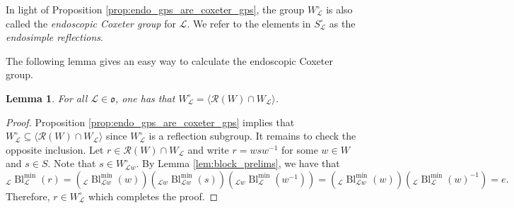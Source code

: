 \documentclass{amsart}
\newcommand{\scrL}{\mathcal{L}}
\newcommand{\fr}[1]{\mathfrak{#1}}
\DeclareMathOperator{\Bl}{Bl}
\newtheorem{lemma}[subsubsection]{Lemma}
\theoremstyle{definition}
\numberwithin{equation}{subsection}
\begin{document}
In light of Proposition \ref{prop:endo_gps_are_coxeter_gps}, the group $W_{\scrL}^{\circ}$ is also called the \emph{endoscopic Coxeter group} for $\scrL$.
We refer to the elements in $S_{\scrL}^{\circ}$ as the \emph{endosimple reflections}.

The following lemma gives an easy way to calculate the endoscopic Coxeter group.

\begin{lemma}\label{lem:calculating_endoscopy_groups}
    For all $\scrL \in \fr{o}$, one has that $W_{\scrL}^{\circ} = \langle \mathscr{R} (W) \cap W_{\scrL} \rangle$. 
\end{lemma}
\begin{proof}
    Proposition \ref{prop:endo_gps_are_coxeter_gps} implies that $W_{\scrL}^{\circ} \subseteq \langle \mathscr{R} (W) \cap W_{\scrL} \rangle$ since $W_{\scrL}^{\circ}$ is a reflection subgroup.
    It remains to check the opposite inclusion. Let $r \in \mathcal{R} (W) \cap W_{\scrL}$ and write $r = wsw^{-1}$ for some $w \in W$ and $s \in S$.
    Note that $s \in W_{\scrL w}^{\circ}$.
    By Lemma \ref{lem:block_prelims}, we have that 
    \[ {}_{\scrL} \Bl^{\min}_{\scrL} (r) = \left( {}_{\scrL} \Bl^{\min}_{\scrL w} (w) \right) \left( {}_{\scrL w} \Bl^{\min}_{\scrL w} (s) \right) \left( {}_{\scrL w} \Bl^{\min}_{\scrL} (w^{-1}) \right) = \left( {}_{\scrL} \Bl^{\min}_{\scrL w} (w) \right) \left( {}_{\scrL} \Bl^{\min}_{\scrL} (w)^{-1} \right) = e.\]
    Therefore, $r \in W_{\scrL}^{\circ}$ which completes the proof.
\end{proof}
\end{document}
